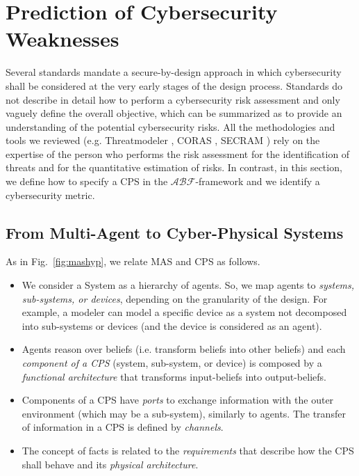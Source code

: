 \documentclass[runningheads]{llncs}
\newcommand{\assertionRegion}{\mathcal{A}}
\newcommand{\beliefRegion}{\mathcal{B}}
\newcommand{\factRegion}{\mathcal{F}}
\newcommand{\abftheory}{\assertionRegion\beliefRegion\factRegion}
\begin{document}
\section{Prediction of Cybersecurity Weaknesses}\label{sec:theory}
Several standards mandate a secure-by-design approach in which cybersecurity
shall be considered at the very early stages of the design process.
Standards do not describe in detail how to perform a cybersecurity risk 
assessment and only vaguely define the overall objective, which
can be summarized as to provide an understanding of the potential cybersecurity risks.
All the methodologies and tools we reviewed (e.g. Threatmodeler \autocite{Threatmodeler},
CORAS \autocite{Lund2010model}, SECRAM \autocite{De2015role})
rely on the expertise of the person who performs the risk assessment for
the identification of threats and for the quantitative estimation of risks.
In contrast, in this section, we define how to specify a CPS in the $\abftheory$-framework
and we identify a cybersecurity metric.

\subsection{From Multi-Agent to Cyber-Physical Systems}
As in Fig.~\ref{fig:mashyp}, we relate MAS and CPS as follows.
\begin{itemize}
	\item We consider a System as a hierarchy of agents. So, we map agents
		to \emph{systems, sub-systems, or devices}, depending on the
		granularity of the design. For example, a modeler can model a
		specific device as a system not decomposed into sub-systems or devices (and
		the device is considered as an agent).
	\item Agents reason over beliefs (i.e. transform beliefs into other
		beliefs) and each \emph{component of a CPS} (system, sub-system,
		or device) is composed by a \emph{functional architecture} that
		transforms input-beliefs into output-beliefs.
	\item Components of a CPS have \emph{ports} to exchange information
		with the outer environment (which may be a sub-system),
		similarly to agents. The transfer of information in a CPS is
		defined by \emph{channels}.
	\item The concept of facts is related to the \emph{requirements}
		that describe how the CPS shall behave and
		its \emph{physical architecture}.

\end{itemize}
\end{document}
